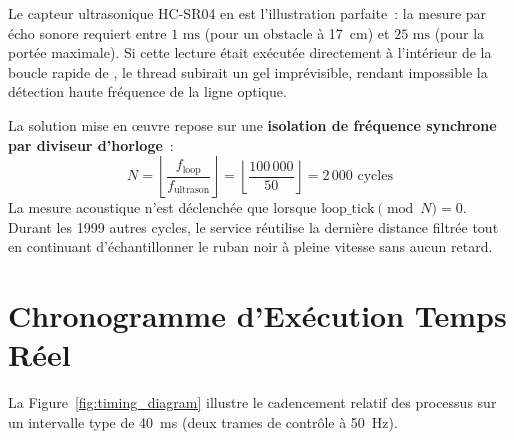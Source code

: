Le capteur ultrasonique HC-SR04 en est l'illustration parfaite~: la mesure par écho sonore requiert entre $1\text{ ms}$ (pour un obstacle à 17~cm) et $25\text{ ms}$ (pour la portée maximale). Si cette lecture était exécutée directement à l'intérieur de la boucle rapide de , le thread subirait un gel imprévisible, rendant impossible la détection haute fréquence de la ligne optique.

La solution mise en œuvre repose sur une \textbf{isolation de fréquence synchrone par diviseur d'horloge}~:
\begin{equation}
    N = \left\lfloor \frac{f_{\text{loop}}}{f_{\text{ultrason}}} \right\rfloor = \left\lfloor \frac{100\,000}{50} \right\rfloor = 2\,000 \text{ cycles}
\end{equation}
La mesure acoustique n'est déclenchée que lorsque $\text{loop\_tick} \pmod N = 0$. Durant les 1999 autres cycles, le service réutilise la dernière distance filtrée tout en continuant d'échantillonner le ruban noir à pleine vitesse sans aucun retard.

\section{Chronogramme d'Exécution Temps Réel}
La Figure~\ref{fig:timing_diagram} illustre le cadencement relatif des processus sur un intervalle type de 40~ms (deux trames de contrôle à 50~Hz).

